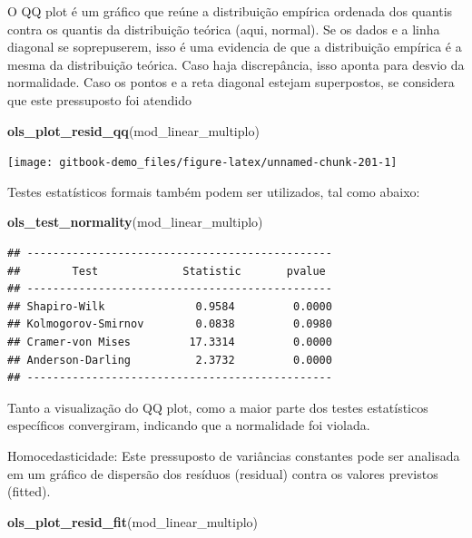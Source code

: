 \documentclass[
]{book}
\newenvironment{Shaded}{\begin{snugshade}}{\end{snugshade}}
\newcommand{\KeywordTok}[1]{\textcolor[rgb]{0.13,0.29,0.53}{\textbf{#1}}}
\newcommand{\NormalTok}[1]{#1}
\begin{document}
O QQ plot é um gráfico que reúne a distribuição empírica ordenada dos
quantis contra os quantis da distribuição teórica (aqui, normal). Se os
dados e a linha diagonal se soprepuserem, isso é uma evidencia de que a
distribuição empírica é a mesma da distribuição teórica. Caso haja
discrepância, isso aponta para desvio da normalidade. Caso os pontos e a
reta diagonal estejam superpostos, se considera que este pressuposto foi
atendido

\begin{Shaded}
\begin{Highlighting}[]
\KeywordTok{ols_plot_resid_qq}\NormalTok{(mod_linear_multiplo)}
\end{Highlighting}
\end{Shaded}

\begin{center}\texttt{[image: gitbook-demo\_files/figure-latex/unnamed-chunk-201-1]} \end{center}

Testes estatísticos formais também podem ser utilizados, tal como
abaixo:

\begin{Shaded}
\begin{Highlighting}[]
\KeywordTok{ols_test_normality}\NormalTok{(mod_linear_multiplo)}
\end{Highlighting}
\end{Shaded}

\begin{verbatim}
## -----------------------------------------------
##        Test             Statistic       pvalue  
## -----------------------------------------------
## Shapiro-Wilk              0.9584         0.0000 
## Kolmogorov-Smirnov        0.0838         0.0980 
## Cramer-von Mises         17.3314         0.0000 
## Anderson-Darling          2.3732         0.0000 
## -----------------------------------------------
\end{verbatim}

Tanto a visualização do QQ plot, como a maior parte dos testes
estatísticos específicos convergiram, indicando que a normalidade foi
violada.

Homocedasticidade: Este pressuposto de variâncias constantes pode ser
analisada em um gráfico de dispersão dos resíduos (residual) contra os
valores previstos (fitted).

\begin{Shaded}
\begin{Highlighting}[]
\KeywordTok{ols_plot_resid_fit}\NormalTok{(mod_linear_multiplo)}
\end{Highlighting}
\end{Shaded}
\end{document}
